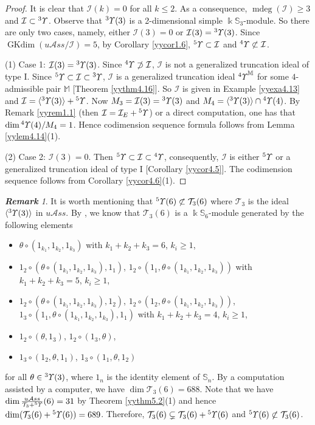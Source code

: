 \documentclass{amsart}
\theoremstyle{definition}
\theoremstyle{remark}
\newtheorem{rmk}[thm]{\bf Remark}
\numberwithin{equation}{section}
\def\S{\mathbb{S}}
\def\mdeg{\operatorname{mdeg}}
\newcommand{\lr}[1]{\langle #1 \rangle}
\newcommand{\up}[1]{{^{#1}{\it \!\Upsilon}}}
\def \uas{u\mathcal{A}ss}
\def \I{\mathcal{I}}
\def \dim{\operatorname{dim}}
\def\gkdim{\operatorname{GKdim}}
\def \S{\mathbb{S}}
\def\T{\mathcal{T}}
\begin{document}
\begin{proof}
It is clear that $\I(k)=0$ for all $k\leq 2$. As a 
consequence, $\mdeg(\I)\geq 3$ and $\I\subset \up{3}$. 
Observe that $\up{3}(3)$ is a 2-dimensional simple 
$\Bbbk \S_3$-module. So there are only two cases, namely, 
either $\I(3)=0$ or $\I(3)=\up{3}(3)$. Since 
$\gkdim (\uas/\I)=5$, by Corollary \ref{yycor1.6}, 
$\up{5}\subset \I$ and $\up{4}\not\subset \I$. 


(1) Case 1: $\I(3)=\up{3}(3)$. Since $\up{4} \not\supset \I$,
$\I$ is not a generalized truncation ideal of type I. Since 
$\up{5}\subset \I \subset \up{3}$, $\I$ is a generalized 
truncation ideal $\up{4}^{\mathbb M}$ for some $4$-admissible 
pair ${\mathbb M}$ [Theorem \ref{yythm4.16}]. So $\I$ is 
given in Example \ref{yyexa4.13} and $\I=\lr{\up{3}(3)}+\up{5}$. 
Now $M_3=\I(3)=\up{3}(3)$ and $M_4=\langle \up{3}(3)\rangle 
\cap \up{4}(4)$. By Remark \ref{yyrem1.1} (then 
$\I=\I_{E}+\up{5}$) or a direct computation, one has that
$\dim \up{4}(4)/M_4=1$. Hence codimension sequence formula 
follows from Lemma \ref{yylem4.14}(1).

(2) Case 2: $\I(3)=0$. Then $\up{5}\subset \I \subset \up{4}$, 
consequently, $\I$ is either $\up{5}$ or a generalized 
truncation ideal of type I [Corollary \ref{yycor4.5}]. The 
codimension sequence follows from Corollary \ref{yycor4.6}(1).
\end{proof}


\begin{rmk}
\label{yyrem5.3} 
It is worth mentioning that $\up{5}(6)\not\subset \T_3(6)$
where $\T_3$ is the ideal $\lr{\up{3}(3)}$ in $\uas$. By 
\cite[Theorem 2.16]{BYZ}, we know that $\T_3(6)$ is 
a $\Bbbk\S_6$-module generated by the following elements
\begin{itemize}
\item 
$\theta\circ (1_{k_1}, 1_{k_2}, 1_{k_3})$ with $k_1+k_2+k_3=6$, 
$k_i\ge 1$, 
\item 
$1_2\circ (\theta\circ (1_{k_1}, 1_{k_2}, 1_{k_3}), 1_1)$,
$1_2\circ (1_1, \theta\circ (1_{k_1}, 1_{k_2}, 1_{k_3}))$ 
with  $k_1+k_2+k_3=5$, $k_i\ge 1$, 
\item 
$1_2\circ (\theta\circ (1_{k_1}, 1_{k_2}, 1_{k_3}), 1_2)$,
$1_2\circ (1_2, \theta\circ (1_{k_1}, 1_{k_2}, 1_{k_3}))$, 
$1_3\circ (1_1, \theta\circ(1_{k_1}, 1_{k_2}, 1_{k_3}), 1_1)$ 
with $k_1+k_2+k_3=4$, $k_i\ge 1$, 
\item 
$1_2\circ (\theta, 1_3)$, $1_2\circ (1_3, \theta)$, 
\item $1_3\circ (1_2, \theta,  1_1)$, $1_3\circ (1_1, \theta,  1_2)$  
\end{itemize}
for all $\theta\in \up{3}(3)$, where $1_n$ is the identity 
element of $\S_n$. By a computation assisted by a 
computer, we have $\dim\T_3(6)=688$. Note that we have 
$\dim \frac{\uas}{\T_3+\up{5}}(6)=31$ by Theorem 
\ref{yythm5.2}(1) and 
hence $\dim (\T_3(6)+\up{5}(6))=689$. Therefore, 
$\T_3(6)\subsetneq \T_3(6)+\up{5}(6)$ and 
$\up{5}(6)\not\subset \T_3(6)$. 
\end{rmk} 
\end{document}
